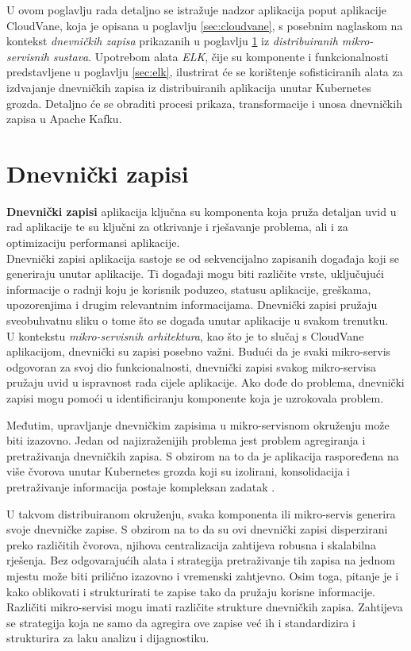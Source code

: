 \documentclass[times, utf8, diplomski]{fer}
\begin{document}
U ovom poglavlju rada detaljno se istražuje nadzor aplikacija poput aplikacije CloudVane, koja je opisana u poglavlju \ref{sec:cloudvane}, s posebnim naglaskom na kontekst \emph{dnevničkih zapisa} prikazanih u poglavlju \ref{sec:logs} iz \emph{distribuiranih mikro-servisnih sustava}. Upotrebom alata \emph{ELK}, čije su komponente i funkcionalnosti predstavljene u poglavlju \ref{sec:elk}, ilustrirat će se korištenje sofisticiranih alata za izdvajanje dnevničkih zapisa iz distribuiranih aplikacija unutar Kubernetes grozda. Detaljno će se obraditi procesi prikaza, transformacije i unosa dnevničkih zapisa u Apache Kafku.

\clearpage
\section{Dnevnički zapisi}
\label{sec:logs}

\textbf{Dnevnički zapisi} aplikacija  ključna su komponenta koja pruža detaljan uvid u rad aplikacije te su ključni za otkrivanje i rješavanje problema, ali i za optimizaciju performansi aplikacije.\\

Dnevnički zapisi aplikacija sastoje se od sekvencijalno zapisanih događaja koji se generiraju unutar aplikacije. Ti događaji mogu biti različite vrste, uključujući informacije o radnji koju je korisnik poduzeo, statusu aplikacije, greškama, upozorenjima i drugim relevantnim informacijama. Dnevnički zapisi pružaju sveobuhvatnu sliku o tome što se događa unutar aplikacije u svakom trenutku.\\

U kontekstu \emph{mikro-servisnih arhitektura}, kao što je to slučaj s CloudVane aplikacijom, dnevnički su zapisi posebno važni. Budući da je svaki mikro-servis odgovoran za svoj dio funkcionalnosti, dnevnički zapisi svakog mikro-servisa pružaju uvid u ispravnost rada cijele aplikacije. Ako dođe do problema, dnevnički zapisi mogu pomoći u identificiranju komponente koja je uzrokovala problem.

Međutim, upravljanje dnevničkim zapisima u mikro-servisnom okruženju može biti izazovno. Jedan od najizraženijih problema jest problem agregiranja i pretraživanja dnevničkih zapisa. S obzirom na to da je aplikacija raspoređena na više čvorova unutar Kubernetes grozda koji su izolirani, konsolidacija i pretraživanje informacija postaje kompleksan zadatak \citep{newman_building_2015}.

U takvom distribuiranom okruženju, svaka komponenta ili mikro-servis generira svoje dnevničke zapise. S obzirom na to da su ovi dnevnički zapisi disperzirani preko različitih čvorova, njihova centralizacija zahtijeva robusna i skalabilna rješenja. Bez odgovarajućih alata i strategija pretraživanje tih zapisa na jednom mjestu može biti prilično izazovno i vremenski zahtjevno. Osim toga, pitanje je i kako oblikovati i strukturirati te zapise tako da pružaju korisne informacije. Različiti mikro-servisi mogu imati različite strukture dnevničkih zapisa. Zahtijeva se strategija koja ne samo da agregira ove zapise već ih i standardizira i strukturira za laku analizu i dijagnostiku. \\
\end{document}
